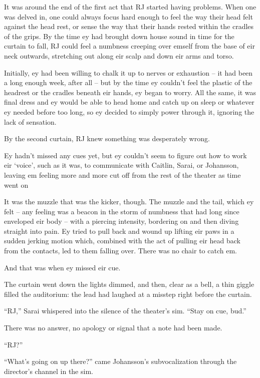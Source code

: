It was around the end of the first act that RJ started having problems. When one was delved in, one could always focus hard enough to feel the way their head felt against the head rest, or sense the way that their hands rested within the cradles of the grips. By the time ey had brought down house sound in time for the curtain to fall, RJ could feel a numbness creeping over emself from the base of eir neck outwards, stretching out along eir scalp and down eir arms and torso.

Initially, ey had been willing to chalk it up to nerves or exhaustion -- it had been a long enough week, after all -- but by the time ey couldn't feel the plastic of the headrest or the cradles beneath eir hands, ey began to worry. All the same, it was final dress and ey would be able to head home and catch up on sleep or whatever ey needed before too long, so ey decided to simply power through it, ignoring the lack of sensation.

By the second curtain, RJ knew something was desperately wrong.

Ey hadn't missed any cues yet, but ey couldn't seem to figure out how to work eir `voice', such as it was, to communicate with Caitlin, Sarai, or Johansson, leaving em feeling more and more cut off from the rest of the theater as time went on

It was the muzzle that was the kicker, though. The muzzle and the tail, which ey felt -- any feeling was a beacon in the storm of numbness that had long since enveloped eir body -- with a piercing intensity, bordering on and then diving straight into pain. Ey tried to pull back and wound up lifting eir paws in a sudden jerking motion which, combined with the act of pulling eir head back from the contacts, led to them falling over. There was no chair to catch em.

And that was when ey missed eir cue.

\secdiv

The curtain went down the lights dimmed, and then, clear as a bell, a thin giggle filled the auditorium: the lead had laughed at a misstep right before the curtain.

``RJ,'' Sarai whispered into the silence of the theater's sim. ``Stay on cue, bud.''

There was no answer, no apology or signal that a note had been made.

``RJ?''

``What's going on up there?'' came Johansson's subvocalization through the director's channel in the sim.

